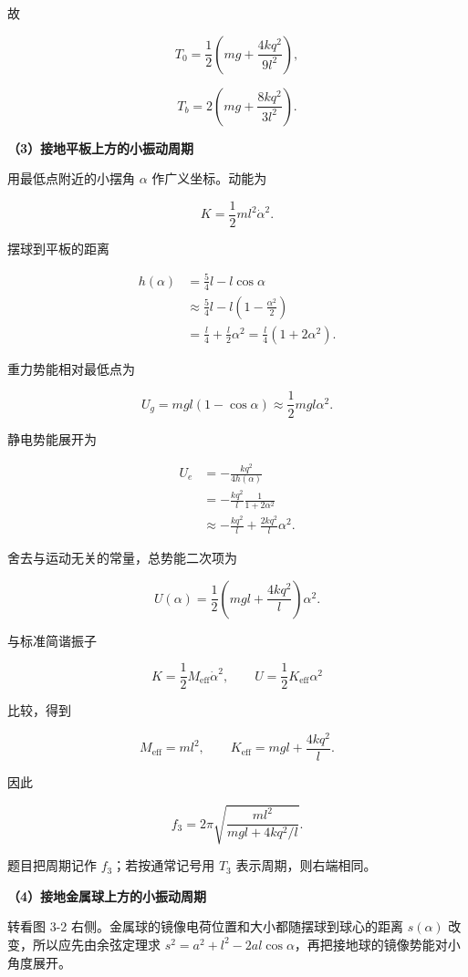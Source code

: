 \documentclass[12pt,a4paper,UTF8]{ctexart}
\begin{document}
故

\[\boxed{T_0=\frac12\left(mg+\frac{4kq^2}{9l^2}\right)},\]

\[\boxed{T_b=2\left(mg+\frac{8kq^2}{3l^2}\right)}. \tag{10}\]

\textbf{（3）接地平板上方的小振动周期}

用最低点附近的小摆角 \(\alpha\) 作广义坐标。动能为

\[K=\frac12ml^2\dot\alpha^2. \tag{11}\]

摆球到平板的距离

\[\begin{aligned}
h(\alpha)
&=\frac54l-l\cos\alpha\\
&\approx\frac54l-l\left(1-\frac{\alpha^2}{2}\right)\\
&=\frac l4+\frac l2\alpha^2
=\frac l4(1+2\alpha^2).
\end{aligned} \tag{12}\]

重力势能相对最低点为

\[U_g=mgl(1-\cos\alpha)\approx\frac12mgl\alpha^2. \tag{13}\]

静电势能展开为

\[\begin{aligned}
U_e
&=-\frac{kq^2}{4h(\alpha)}\\
&=-\frac{kq^2}{l}\frac1{1+2\alpha^2}\\
&\approx-\frac{kq^2}{l}+\frac{2kq^2}{l}\alpha^2.
\end{aligned} \tag{14}\]

舍去与运动无关的常量，总势能二次项为

\[U(\alpha)=\frac12\left(mgl+\frac{4kq^2}{l}\right)\alpha^2. \tag{15}\]

与标准简谐振子

\[K=\frac12M_{\mathrm{eff}}\dot\alpha^2,\qquad
U=\frac12K_{\mathrm{eff}}\alpha^2\]

比较，得到

\[M_{\mathrm{eff}}=ml^2,\qquad
K_{\mathrm{eff}}=mgl+\frac{4kq^2}{l}.\]

因此

\[\boxed{
f_3=2\pi\sqrt{\frac{ml^2}{mgl+4kq^2/l}}
}. \tag{16}\]

题目把周期记作 \(f_3\)；若按通常记号用 \(T_3\) 表示周期，则右端相同。

\textbf{（4）接地金属球上方的小振动周期}

转看图 3-2 右侧。金属球的镜像电荷位置和大小都随摆球到球心的距离
\(s(\alpha)\) 改变，所以应先由余弦定理求
\(s^2=a^2+l^2-2al\cos\alpha\)，再把接地球的镜像势能对小角度展开。
\end{document}
